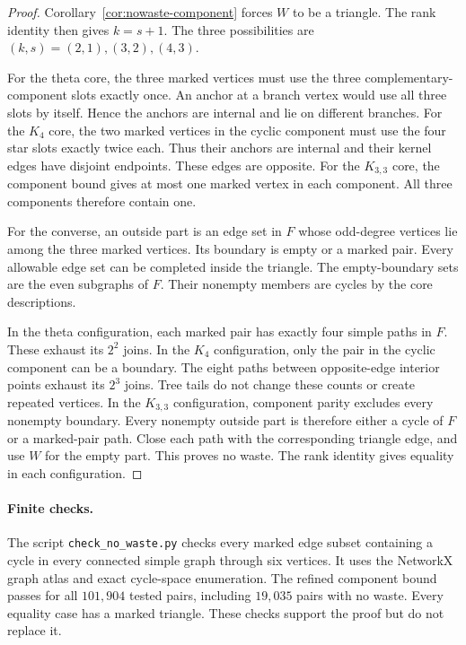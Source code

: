 \begin{proof}
Corollary~\ref{cor:nowaste-component} forces $W$ to be a triangle.
The rank identity then gives $k=s+1$.
The three possibilities are $(k,s)=(2,1),(3,2),(4,3)$.

For the theta core, the three marked vertices must use the three complementary-component slots exactly once.
An anchor at a branch vertex would use all three slots by itself.
Hence the anchors are internal and lie on different branches.
For the $K_4$ core, the two marked vertices in the cyclic component must use the four star slots exactly twice each.
Thus their anchors are internal and their kernel edges have disjoint endpoints.
These edges are opposite.
For the $K_{3,3}$ core, the component bound gives at most one marked vertex in each component.
All three components therefore contain one.

For the converse, an outside part is an edge set in $F$ whose odd-degree vertices lie among the three marked vertices.
Its boundary is empty or a marked pair.
Every allowable edge set can be completed inside the triangle.
The empty-boundary sets are the even subgraphs of $F$.
Their nonempty members are cycles by the core descriptions.

In the theta configuration, each marked pair has exactly four simple paths in $F$.
These exhaust its $2^2$ joins.
In the $K_4$ configuration, only the pair in the cyclic component can be a boundary.
The eight paths between opposite-edge interior points exhaust its $2^3$ joins.
Tree tails do not change these counts or create repeated vertices.
In the $K_{3,3}$ configuration, component parity excludes every nonempty boundary.
Every nonempty outside part is therefore either a cycle of $F$ or a marked-pair path.
Close each path with the corresponding triangle edge, and use $W$ for the empty part.
This proves no waste.
The rank identity gives equality in each configuration.
\end{proof}

\paragraph{Finite checks.}
The script \texttt{check\_no\_waste.py} checks every marked edge subset containing a cycle in every connected simple graph through six vertices.
It uses the NetworkX graph atlas and exact cycle-space enumeration.
The refined component bound passes for all $101{,}904$ tested pairs, including $19{,}035$ pairs with no waste.
Every equality case has a marked triangle.
These checks support the proof but do not replace it.
